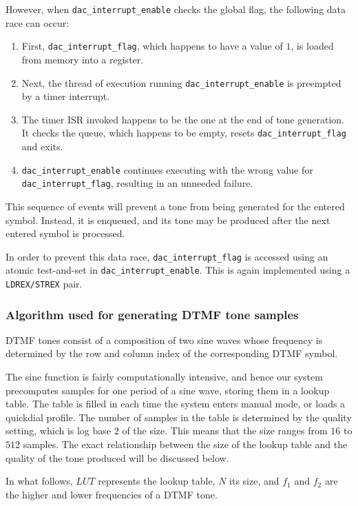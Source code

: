 \documentclass[11pt,a4paper,twocolumn]{scrartcl}
\begin{document}
However, when \verb!dac_interrupt_enable! checks the global flag, the following data race can occur:
\begin{enumerate}
   \item First, \verb!dac_interrupt_flag!, which happens to have a value of $1$, is loaded from memory into a register.
   \item Next, the thread of execution running \verb!dac_interrupt_enable! is preempted by a timer interrupt.
   \item The timer ISR invoked happens to be the one at the end of tone generation. It checks the queue, which happens to be empty, resets \verb!dac_interrupt_flag! and exits.
   \item \verb!dac_interrupt_enable! continues executing with the wrong value for \verb!dac_interrupt_flag!, resulting in an unneeded failure.
\end{enumerate}

This sequence of events will prevent a tone from being generated for the entered symbol. Instead, it is enqueued, and its tone may be produced after the next entered symbol is processed.

In order to prevent this data race, \verb!dac_interrupt_flag! is accessed using an atomic test-and-set in \verb!dac_interrupt_enable!. This is again implemented using a \verb!LDREX/STREX! pair.

\subsubsection{Algorithm used for generating DTMF tone samples}

DTMF tones consist of a composition of two sine waves whose frequency is determined by the row and column index of the corresponding DTMF symbol.

The sine function is fairly computationally intensive, and hence our system precomputes samples for one period of a sine wave, storing them in a lookup table. The table is filled in each time the system enters manual mode, or loads a quickdial profile. The number of samples in the table is determined by the quality setting, which is log base $2$ of the size. This means that the size ranges from $16$ to $512$ samples. The exact relationship between the size of the lookup table and the quality of the tone produced will be discussed below.

In what follows, $LUT$ represents the lookup table, $N$ its size, and $f_1$ and $f_2$ are the higher and lower frequencies of a DTMF tone.
\end{document}
